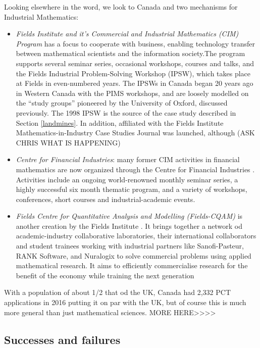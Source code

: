 \documentclass[11pt]{article} %
\begin{document}
	Looking elsewhere in the word, we look to Canada and two mechanisms for Industrial Mathematics: 
	

	\begin{itemize}
		\item \textit{Fields Institute and it's Commercial and Industrial Mathematics (CIM) Program} \cite{FieldsCIM}  has a focus to cooperate with business, enabling technology transfer between mathematical scientists and the information society.The program supports several seminar series, occasional workshops, courses and talks, and the Fields Industrial Problem-Solving Workshop (IPSW), which takes place at Fields in even-numbered years. The IPSWs in Canada began 20 years ago in Western Canada with the PIMS workshops, and are loosely modelled on the “study groups” pioneered by the University of Oxford, discussed previously. The 1998 IPSW is the source of the case study described in Section \ref{landmines}.
		 In addition, affiliated with  the Fields Institute Mathematics-in-Industry Case Studies Journal was launched, although (ASK CHRIS WHAT IS HAPPENING) 
		\item \textit{Centre for Financial Industries}: many former CIM activities in financial mathematics are now organized through the Centre for Financial Industries \cite{FieldsCFI}. Activities include an ongoing world-renowned monthly seminar series, a highly successful six month thematic program, and a variety of workshops, conferences, short courses and industrial-academic events. 
		\item \textit{Fields Centre for Quantitative Analysis and Modelling (Fields-CQAM)} is another creation by the Fields Institute \cite{CQAM}. It brings together a network od academic-industry collaborative laboratories, their international collaborators and  student trainees working   with industrial partners like Sanofi-Pasteur, RANK Software, and Nuralogix to solve commercial problems using applied mathematical research. It aims to efficiently commercialise research for the benefit of the economy while training the next generation 
	\end{itemize}
	

	
With a population of about 1/2 that od the UK, Canada had 2,332 PCT applications in 2016 \cite{WIPO} putting it on par with the UK, but of course this is much more general than just mathematical sciences. MORE HERE>>>>
	\subsection{Successes and failures}
	
\end{document}
